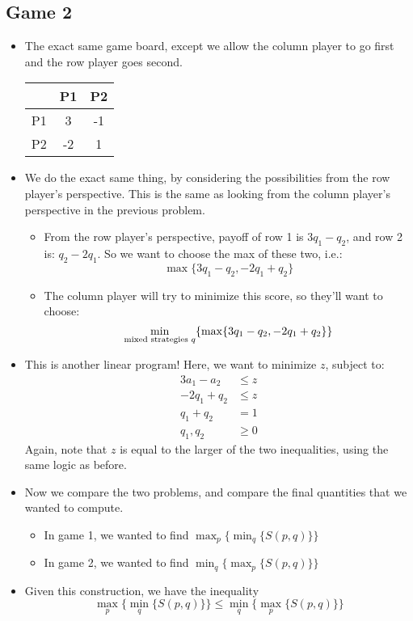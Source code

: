 \subsection{Game 2}
\begin{itemize}
	\item The exact same game board, except we allow the column player to go first and the row player goes 
		second. 
		\begin{center}
			\begin{tabular}{c|c|c}
				& P1& P2\\
				\hline 
				P1 & 3 & -1\\
				\hline
				P2 & -2 & 1
			\end{tabular}
		\end{center}
	\item We do the exact same thing, by considering the possibilities from the row player's perspective. This
		is the same as looking from the column player's perspective in the previous problem. 
		\begin{itemize} 
			\item From the row player's perspective, payoff of row 1 is \(3q_1 - q_2\), and row 2 is: 
				\(q_2 - 2q_1\). So we want to choose the max of these two, i.e.:
				\[
				\max \{3q_1 - q_2, -2q_1 + q_2\} 
				\] 
			\item The column player will try to minimize this score, so they'll want to choose:
				\[
					\min_{\text{mixed strategies \( q\)}} \{ \max \{3q_1 - q_2, -2q_1 + q_2\} \} 
				\] 
		\end{itemize}
	\item This is another linear program! Here, we want to minimize \(z\), subject to:
		\begin{align*}
			3a_1 - a_2 &\le  z\\
			-2q_1 + q_2 &\le z\\
			q_1 + q_2 &=  1 \\
			q_1, q_2 &\ge 0
		\end{align*}
		Again, note that \(z\) is equal to the larger of the two inequalities, using the same logic as 
		before.
	\item Now we compare the two problems, and compare the final quantities that we wanted to compute. 
		\begin{itemize}
			\item In game 1, we wanted to find \(\max_p \{\min_q \{S(p, q)\} \} \) 
			\item In game 2, we wanted to find \(\min_q \{\max_p \{S(p, q)\} \} \)
		\end{itemize}
	\item Given this construction, we have the inequality
		\[
		\max_p \{\min_q \{S(p, q)\} \} \le \min_q \{\max_p \{S(p, q)\} \} 
		\] 
		

\end{itemize}
